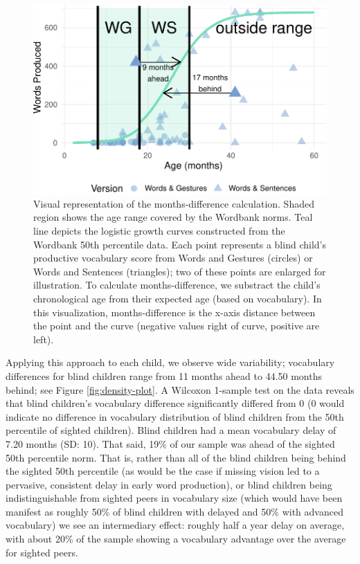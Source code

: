 \documentclass[
  man,floatsintext]{apa6}
\begin{document}
\begin{figure}
\centering
\includegraphics{VI_CDI_manuscript_files/figure-latex/growth-curve-illustration-1.pdf}
\caption{\label{fig:growth-curve-illustration}Visual representation of the months-difference calculation. Shaded region shows the age range covered by the Wordbank norms. Teal line depicts the logistic growth curves constructed from the Wordbank 50th percentile data. Each point represents a blind child's productive vocabulary score from Words and Gestures (circles) or Words and Sentences (triangles); two of these points are enlarged for illustration. To calculate months-difference, we substract the child's chronological age from their expected age (based on vocabulary). In this visualization, months-difference is the x-axis distance between the point and the curve (negative values right of curve, positive are left).}
\end{figure}

Applying this approach to each child, we observe wide variability; vocabulary differences for blind children range from 11 months ahead to 44.50 months behind; see Figure \ref{fig:density-plot}. A Wilcoxon 1-sample test on the data reveals that blind children's vocabulary difference significantly differed from 0 (0 would indicate no difference in vocabulary distribution of blind children from the 50th percentile of sighted children). Blind children had a mean vocabulary delay of 7.20 months (SD: 10). That said, 19\% of our sample was ahead of the sighted 50th percentile norm. That is, rather than all of the blind children being behind the sighted 50th percentile (as would be the case if missing vision led to a pervasive, consistent delay in early word production), or blind children being indistinguishable from sighted peers in vocabulary size (which would have been manifest as roughly 50\% of blind children with delayed and 50\% with advanced vocabulary) we see an intermediary effect: roughly half a year delay on average, with about 20\% of the sample showing a vocabulary advantage over the average for sighted peers.
\end{document}
